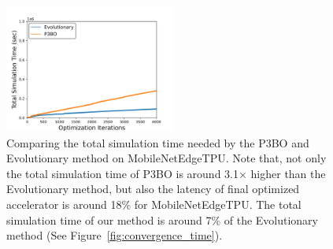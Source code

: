 \begin{figure}[t!]
    \centering
    \includegraphics[width=0.5\textwidth]{chapters/prime/figs/convergence_time_v2_evolutionary_vs_p3bo.png}
    \caption{Comparing the total simulation time needed by the P3BO and Evolutionary method on MobileNetEdgeTPU. Note that, not only the total simulation time of P3BO is around 3.1$\times$ higher than the Evolutionary method, but also the latency of final optimized accelerator is around 18\% for MobileNetEdgeTPU. The total simulation time of our method is around 7\% of the Evolutionary method (See Figure~\ref{fig:convergence_time}).}
    \label{fig:converg_p3bo_evolutionary}
    \vspace{-0.1in}
\end{figure}
%

%


